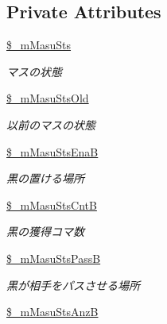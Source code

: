 \subsection*{Private Attributes}
\begin{DoxyCompactItemize}
\item 
\hyperlink{class_reversi_a22a84a78f0a3b0f9931591298e2da4d7}{\$\+\_\+m\+Masu\+Sts}\hypertarget{class_reversi_a22a84a78f0a3b0f9931591298e2da4d7}{}\label{class_reversi_a22a84a78f0a3b0f9931591298e2da4d7}

\begin{DoxyCompactList}\small\item\em マスの状態 \end{DoxyCompactList}\item 
\hyperlink{class_reversi_af7aec5a588ed3b17db84cd79c2e2599d}{\$\+\_\+m\+Masu\+Sts\+Old}\hypertarget{class_reversi_af7aec5a588ed3b17db84cd79c2e2599d}{}\label{class_reversi_af7aec5a588ed3b17db84cd79c2e2599d}

\begin{DoxyCompactList}\small\item\em 以前のマスの状態 \end{DoxyCompactList}\item 
\hyperlink{class_reversi_a9fd66ba0b00c0bab1f84e64526653c38}{\$\+\_\+m\+Masu\+Sts\+EnaB}\hypertarget{class_reversi_a9fd66ba0b00c0bab1f84e64526653c38}{}\label{class_reversi_a9fd66ba0b00c0bab1f84e64526653c38}

\begin{DoxyCompactList}\small\item\em 黒の置ける場所 \end{DoxyCompactList}\item 
\hyperlink{class_reversi_a24c5cf73681d3920c3330e9d0afaf3a2}{\$\+\_\+m\+Masu\+Sts\+CntB}\hypertarget{class_reversi_a24c5cf73681d3920c3330e9d0afaf3a2}{}\label{class_reversi_a24c5cf73681d3920c3330e9d0afaf3a2}

\begin{DoxyCompactList}\small\item\em 黒の獲得コマ数 \end{DoxyCompactList}\item 
\hyperlink{class_reversi_a384407818dc2c9378716ee1f135b9f01}{\$\+\_\+m\+Masu\+Sts\+PassB}\hypertarget{class_reversi_a384407818dc2c9378716ee1f135b9f01}{}\label{class_reversi_a384407818dc2c9378716ee1f135b9f01}

\begin{DoxyCompactList}\small\item\em 黒が相手をパスさせる場所 \end{DoxyCompactList}\item 
\hyperlink{class_reversi_ade4534b9cb287ab570e5cbd9c6b8099c}{\$\+\_\+m\+Masu\+Sts\+AnzB}\hypertarget{class_reversi_ade4534b9cb287ab570e5cbd9c6b8099c}{}\label{class_reversi_ade4534b9cb287ab570e5cbd9c6b8099c}


\end{DoxyCompactItemize}
